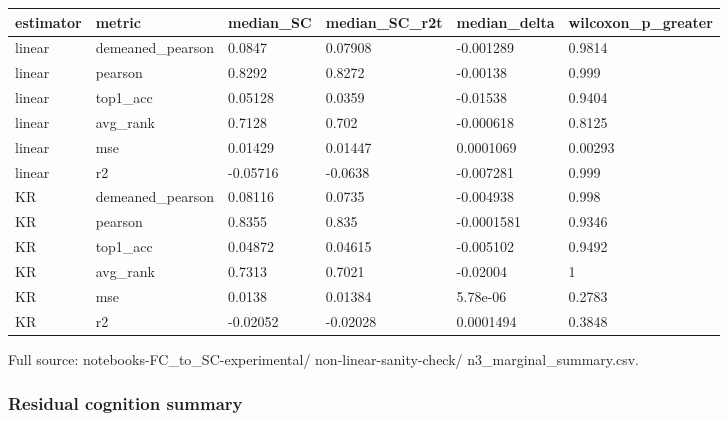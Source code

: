 {\def\LTcaptype{none} %
\begin{longtable}[]{@{}llllll@{}}
\toprule\noalign{}
estimator & metric & median\_SC & median\_SC\_r2t & median\_delta & wilcoxon\_p\_greater \\
\midrule\noalign{}
\endhead
\bottomrule\noalign{}
\endlastfoot
linear & demeaned\_pearson & 0.0847 & 0.07908 & -0.001289 & 0.9814 \\
linear & pearson & 0.8292 & 0.8272 & -0.00138 & 0.999 \\
linear & top1\_acc & 0.05128 & 0.0359 & -0.01538 & 0.9404 \\
linear & avg\_rank & 0.7128 & 0.702 & -0.000618 & 0.8125 \\
linear & mse & 0.01429 & 0.01447 & 0.0001069 & 0.00293 \\
linear & r2 & -0.05716 & -0.0638 & -0.007281 & 0.999 \\
KR & demeaned\_pearson & 0.08116 & 0.0735 & -0.004938 & 0.998 \\
KR & pearson & 0.8355 & 0.835 & -0.0001581 & 0.9346 \\
KR & top1\_acc & 0.04872 & 0.04615 & -0.005102 & 0.9492 \\
KR & avg\_rank & 0.7313 & 0.7021 & -0.02004 & 1 \\
KR & mse & 0.0138 & 0.01384 & 5.78e-06 & 0.2783 \\
KR & r2 & -0.02052 & -0.02028 & 0.0001494 & 0.3848 \\
\end{longtable}
}

Full source: notebooks-FC\_to\_SC-experimental/ non-linear-sanity-check/ n3\_marginal\_summary.csv.

\subsubsection{Residual cognition summary}\label{residual-cognition-summary}

